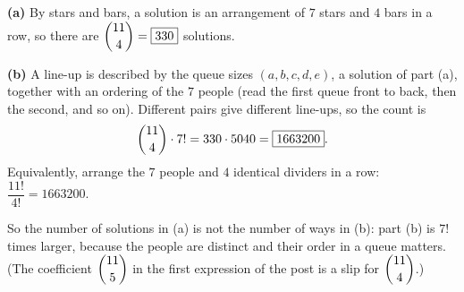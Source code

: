 \textbf{(a)} By stars and bars, a solution is an arrangement of $7$ stars and $4$ bars in a row, so there are $\dbinom{11}{4}=\boxed{330}$ solutions.

\textbf{(b)} A line-up is described by the queue sizes $(a,b,c,d,e)$, a solution of part (a), together with an ordering of the $7$ people (read the first queue front to back, then the second, and so on). Different pairs give different line-ups, so the count is
\[
\dbinom{11}{4}\cdot7!=330\cdot5040=\boxed{1663200}.
\]
Equivalently, arrange the $7$ people and $4$ identical dividers in a row: $\dfrac{11!}{4!}=1663200$.

So the number of solutions in (a) is not the number of ways in (b): part (b) is $7!$ times larger, because the people are distinct and their order in a queue matters. (The coefficient $\dbinom{11}{5}$ in the first expression of the post is a slip for $\dbinom{11}{4}$.)
